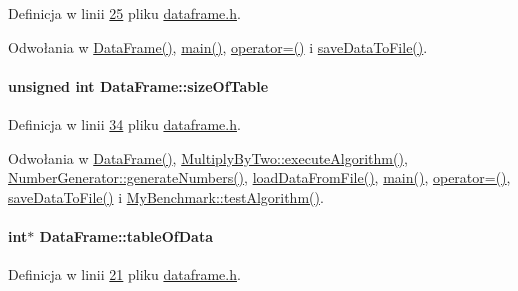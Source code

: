 Definicja w linii \hyperlink{dataframe_8h_source_l00025}{25} pliku \hyperlink{dataframe_8h_source}{dataframe.\-h}.



Odwołania w \hyperlink{dataframe_8cpp_source_l00012}{Data\-Frame()}, \hyperlink{main_8cpp_source_l00017}{main()}, \hyperlink{dataframe_8cpp_source_l00044}{operator=()} i \hyperlink{dataframe_8cpp_source_l00032}{save\-Data\-To\-File()}.

\hypertarget{class_data_frame_aa5d1905c6910cad07ab5189bd34b13ab}{
\paragraph[{size\-Of\-Table}]{\setlength{\rightskip}{0pt plus 5cm}unsigned int Data\-Frame\-::size\-Of\-Table}}\label{class_data_frame_aa5d1905c6910cad07ab5189bd34b13ab}


Definicja w linii \hyperlink{dataframe_8h_source_l00034}{34} pliku \hyperlink{dataframe_8h_source}{dataframe.\-h}.



Odwołania w \hyperlink{dataframe_8cpp_source_l00012}{Data\-Frame()}, \hyperlink{multiplybytwo_8cpp_source_l00011}{Multiply\-By\-Two\-::execute\-Algorithm()}, \hyperlink{numbergenerator_8h_source_l00031}{Number\-Generator\-::generate\-Numbers()}, \hyperlink{dataframe_8cpp_source_l00020}{load\-Data\-From\-File()}, \hyperlink{main_8cpp_source_l00017}{main()}, \hyperlink{dataframe_8cpp_source_l00044}{operator=()}, \hyperlink{dataframe_8cpp_source_l00032}{save\-Data\-To\-File()} i \hyperlink{mybenchmark_8cpp_source_l00012}{My\-Benchmark\-::test\-Algorithm()}.

\hypertarget{class_data_frame_a8edc4ce524483e2e5069067267ccdcbf}{
\paragraph[{table\-Of\-Data}]{\setlength{\rightskip}{0pt plus 5cm}int$\ast$ Data\-Frame\-::table\-Of\-Data}}\label{class_data_frame_a8edc4ce524483e2e5069067267ccdcbf}


Definicja w linii \hyperlink{dataframe_8h_source_l00021}{21} pliku \hyperlink{dataframe_8h_source}{dataframe.\-h}.



